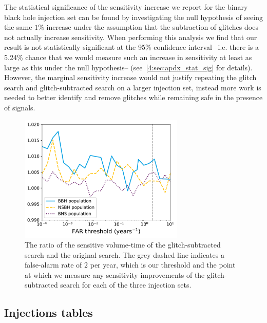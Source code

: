 The statistical significance of the sensitivity increase we report for the binary black hole injection set can be found by investigating the null hypothesis of seeing the same $1\%$ increase under the assumption that the subtraction of \scladj glitches does not actually increase sensitivity. When performing this analysis we find that our result is not statistically significant at the 95\% confidence interval --i.e. there is a 5.24\% chance that we would measure such an increase in sensitivity at least as large as this under the null hypothesis-- (see~\ref{4:sec:apdx_stat_sig} for details). However, the marginal sensitivity increase would not justify repeating the \scladj glitch search and glitch-subtracted \gwadj search on a larger injection set, instead more work is needed to better identify and remove \scladj glitches while remaining safe in the presence of \gwadj signals.

\begin{figure}
     \centering
     \includegraphics[width=0.7\textwidth]{images/4_archenemy/Section4/4.1/allinj_vt_ratio_ArchEnemy_coinc.pdf}
     \caption{The ratio of the sensitive volume-time of the glitch-subtracted search and the original \gwadj search. The grey dashed line indicates a false-alarm rate of $2$ per year, which is our threshold and the point at which we measure any sensitivity improvements of the glitch-subtracted search for each of the three \gwadj injection sets. }
     \label{4:fig:allinj_vt_ratio}
\end{figure}

\subsection{\label{4:sec:apdx_injections_table}Injections tables}

